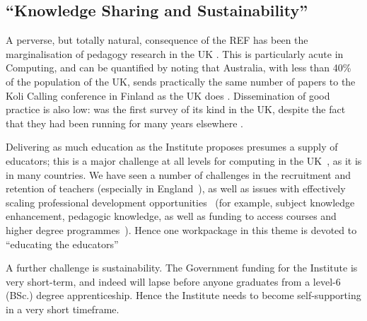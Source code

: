 \documentclass[sigconf,anonymous]{acmart}
\begin{document}
\subsection{``Knowledge Sharing and Sustainability''}

A perverse, but totally natural, consequence of the REF has been the
marginalisation of pedagogy research in the UK
\cite{Cottonetal2018a}. This is particularly acute in Computing, and
can be quantified by noting that Australia, with less than 40\% of the
population of the UK, sends practically the same number of papers to
the Koli Calling conference in Finland as the UK does
\cite{Simon2016a}. Dissemination of good practice is also low:
\cite{murphy-et-al:programming2017} was the first survey of its kind
in the UK, despite the fact that they had been running for many years
elsewhere \cite{simon-et-al:sigcse2018}.

Delivering as much education as the Institute proposes presumes a
supply of educators; this is a major challenge at all levels for
computing in the UK~\cite{brown-et-al:toce2014}, as it is in many
countries. We have seen a number of challenges in the recruitment and
retention of teachers (especially in
England~\cite{sentance+waite:2018}), as well as issues with
effectively scaling professional development
opportunities~\cite{sentance+csizmadia:2017} (for example, subject
knowledge enhancement, pedagogic knowledge, as well as funding to
access courses and higher degree
programmes~\cite{sentance-et-al-wipsce2012}).  Hence one workpackage
in this theme is devoted to ``educating the educators''

A further challenge is sustainability. The Government funding for the
Institute is very short-term, and indeed will lapse before anyone
graduates from a level-6 (BSc.)  degree apprenticeship. Hence the
Institute needs to become self-supporting in a very short timeframe.




\end{document}
